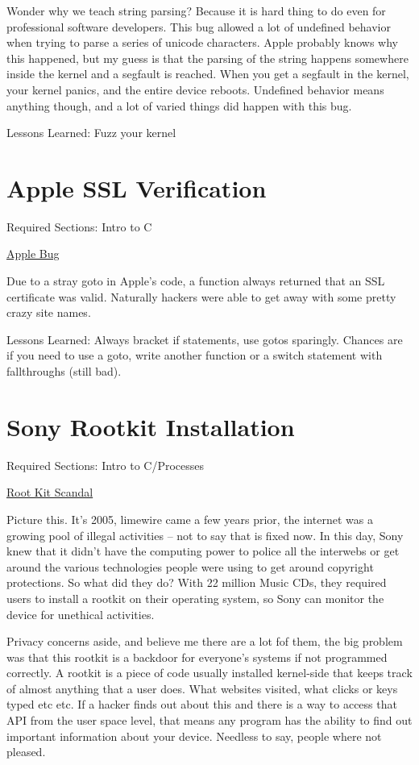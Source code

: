 Wonder why we teach string parsing? Because it is hard thing to do even for professional software developers. This bug allowed a lot of undefined behavior when trying to parse a series of unicode characters. Apple probably knows why this happened, but my guess is that the parsing of the string happens somewhere inside the kernel and a segfault is reached. When you get a segfault in the kernel, your kernel panics, and the entire device reboots. Undefined behavior means anything though, and a lot of varied things did happen with this bug.

Lessons Learned: Fuzz your kernel

\section{Apple SSL Verification}

Required Sections: Intro to C

\href{https://en.wikipedia.org/wiki/Unreachable_code#Examples}{Apple Bug}


Due to a stray goto in Apple's code, a function always returned that an SSL certificate was valid. Naturally hackers were able to get away with some pretty crazy site names.

Lessons Learned: Always bracket if statements, use gotos sparingly. Chances are if you need to use a goto, write another function or a switch statement with fallthroughs (still bad).

\section{Sony Rootkit Installation}

Required Sections: Intro to C/Processes

\href{https://en.wikipedia.org/wiki/Sony_BMG_copy_protection_rootkit_scandal}{Root Kit Scandal}

Picture this. It's 2005, limewire came a few years prior, the internet was a growing pool of illegal activities -- not to say that is fixed now. In this day, Sony knew that it didn't have the computing power to police all the interwebs or get around the various technologies people were using to get around copyright protections. So what did they do? With 22 million Music CDs, they required users to install a rootkit on their operating system, so Sony can monitor the device for unethical activities.

Privacy concerns aside, and believe me there are a lot fof them, the big problem was that this rootkit is a backdoor for everyone's systems if not programmed correctly. A rootkit is a piece of code usually installed kernel-side that keeps track of almost anything that a user does. What websites visited, what clicks or keys typed etc etc. If a hacker finds out about this and there is a way to access that API from the user space level, that means any program has the ability to find out important information about your device. Needless to say, people where not pleased.

